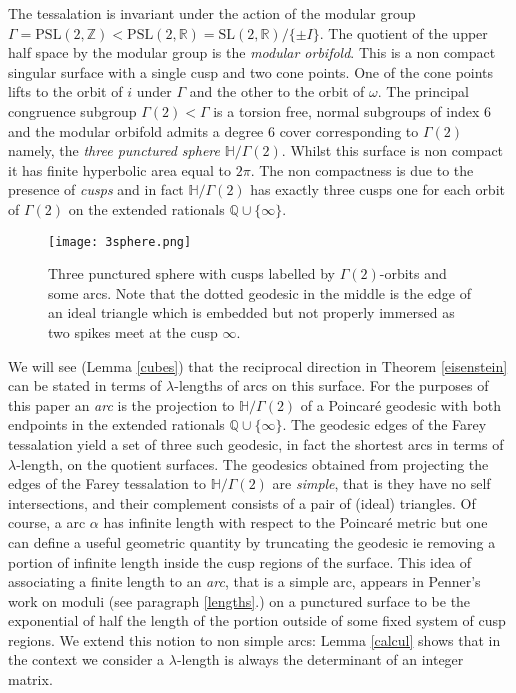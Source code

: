 \documentclass[12pt]{amsart}
\theoremstyle{plain}
\theoremstyle{definition}
\def\HH{\mathbb{H}}
\def\xx{\HH/g2}
\def\ZZ{\mathbb{Z}}
\def\RR{\mathbb{R}}
\def\QQ{\mathbb{Q}}
\def\sl2{\mathrm{PSL}(2, \ZZ)}
\def\slr{\mathrm{PSL}(2, \RR)}
\def\g2{\Gamma(2)}
\def\xx{\HH/\g2}
\begin{document}
The tessalation is invariant under the action of the modular group
$\Gamma = \sl2< \slr = \mathrm{SL}(2, \RR)/\{ \pm I\}$.
The quotient  of the upper half space by the modular group 
is the \textit{modular orbifold}. This is a non compact singular
surface with a single cusp and two cone points. 
One of the cone points lifts to the orbit of $i$  under $\Gamma$ 
and the other to the orbit of $\omega$.
The principal congruence subgroup $\g2<\Gamma$
 is a torsion free, normal subgroups of index 6
and the modular orbifold admits a degree 6 cover
corresponding to $\g2$
namely, the \textit{three punctured sphere} $\HH/\g2$.
Whilst this surface is non compact it has finite hyperbolic area
equal to $2\pi$. The non compactness is due to the presence of
\textit{cusps} and in fact  $\HH/\g2$ has exactly three cusps one for each orbit of $\g2$ on the extended rationals $\QQ \cup \{ \infty \}$.


\begin{figure}[ht]
\begin{center}
\texttt{[image: 3sphere.png]} 
% 
\end{center}
\caption{Three punctured sphere with cusps labelled by $\Gamma(2)$-orbits
and some arcs.
Note that the dotted geodesic in the middle is the edge 
of an ideal triangle which is embedded but not properly immersed
as two spikes meet at the cusp $\infty$.}
 \label{3punctured}
\end{figure}

We will see (Lemma \ref{cubes}) that the reciprocal direction in 
Theorem \ref{eisenstein} can be stated in terms  of  $\lambda$-lengths
 of arcs on  this surface.
 For the purposes of this paper
 an \textit{arc}  
 is the projection to $\xx$ of a 
 Poincar\'e geodesic with both  endpoints in the 
 extended rationals $\QQ \cup \{ \infty\}$.
The geodesic edges of the Farey tessalation yield a set of three such geodesic, 
 in fact the shortest arcs
 in terms of $\lambda$-length,  on the quotient surfaces.
The geodesics obtained from projecting the edges of the Farey
tessalation to $\xx$
are \textit{simple}, that is they have no self intersections, 
and their complement consists of a pair of (ideal) triangles.
Of course, a arc $\alpha$ has infinite length with respect to the Poincar\'e metric  but one can define a useful geometric quantity   by truncating the geodesic ie removing a portion of infinite length  inside the cusp regions of the surface.
This idea of associating a finite length to an \textit{arc},
that is a simple arc,
appears in Penner's work on moduli \cite{bob}
 (see paragraph \ref{lengths}.) 
on a punctured
surface to be the exponential of half the 
length of the portion outside of some fixed
system of cusp regions.
We extend this notion to non simple arcs:
Lemma \ref{calcul} shows that in the context we consider
a $\lambda$-length is always the determinant 
of an integer matrix.
\end{document}
